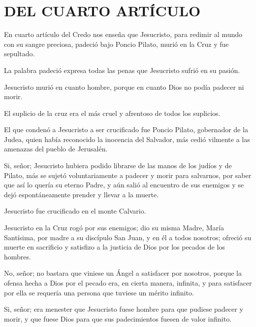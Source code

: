 \section{DEL CUARTO ARTÍCULO}

En cuarto artículo del Credo nos enseña que Jesucristo, para redimir al mundo
con su sangre preciosa, padeció bajo Poncio Pilato, murió en la Cruz y fue
sepultado.

La palabra padeció expresa todas las penas que Jesucristo sufrió en su pasión.

 Jesucristo
murió en cuanto hombre, porque en cuanto Dios no podía padecer ni morir.

 El suplicio de la cruz era el
más cruel y afrentoso de todos los suplicios.

 El que
condenó a Jesucristo a ser crucificado fue Poncio Pilato, gobernador de la Judea,
quien había reconocido la inocencia del Salvador, más cedió vilmente a las
amenazas del pueblo de Jerusalén.

 Si, señor; Jesucristo hubiera podido librarse de las manos de los
judíos y de Pilato, más se sujetó voluntariamente a padecer y morir para salvarnos,
por saber que así lo quería su eterno Padre, y aún salió al encuentro de sus
enemigos y se dejó espontáneamente prender y llevar a la muerte.

 Jesucristo fue crucificado en el
monte Calvario.

 Jesucristo en la Cruz rogó por sus
enemigos; dio su misma Madre, María Santísima, por madre a su discípulo San
Juan, y en él a todos nosotros; ofreció su muerte en sacrificio y satisfizo a la
justicia de Dios por los pecados de los hombres.

 No,
señor; no bastara que viniese un Ángel a satisfacer por nosotros, porque la ofensa
hecha a Dios por el pecado era, en cierta manera, infinita, y para satisfacer por ella se requería una persona que tuviese un mérito infinito.

 Si, señor; era menester que Jesucristo fuese
hombre para que pudiese padecer y morir, y que fuese Dios para que sus
padecimientos fuesen de valor infinito.

